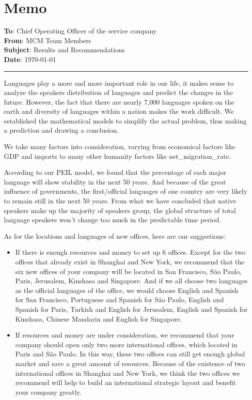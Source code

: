 \documentclass{mcmthesis}
\begin{document}
  
  \section{Memo}
  
  \textbf{To}: Chief Operating Officer of the service company\\
  \textbf{From}: MCM Team Members\\
  \textbf{Subject}: Results and Recommendations\\
  \textbf{Date}: {\today}\\
   \noindent\rule{\textwidth}{0.5pt}
   
      Languages play a more and more important role in our life, it makes sense to analyze the speakers distribution of languages and predict the changes in the future. However, the fact that there are nearly 7,000 languages spoken on the earth and diversity of languages within a nation makes the work difficult. We established the mathematical models to simplify the actual problem, thus making a prediction and drawing a conclusion.
      
     \indent We take many factors into consideration, varying from economical factors like GDP and imports to many other humanity factors like net\_migration\_rate.
      
      According to our PEIL model, we found that the percentage of each major language will show stability in the next 50 years. And because of the great influence of governments, the first/official languages of one country are very likely to remain still in the next 50 years. From what we have concluded that native speakers make up the majority of speakers group, the global structure of total language speakers won't change too much in the predictable time period. 
      
      As for the locations and languages of new offices, here are our suggestions:
   \begin{itemize}
      \item If there is enough resources and money to set up 6 offices. Except for the two offices that already exist in Shanghai and New York, we recommend that the six new offices of your company will be located in San Francisco, São Paulo, Paris, Jerusalem, Kinshasa and Singapore. And if we all choose two languages as the official languages of the office, we would choose English and Spanish for San Francisco,  Portuguese and Spanish for São Paulo,  English and Spanish for Paris, Turkish and English for Jerusalem,  English and Spanish for Kinshasa, Chinese Mandarin and English for Singapore.
      \item If resources and money are under consideration, we recommend that your company should open only two more international offices, which located in Paris and São Paulo. In this way,  these two offices can still get enough global market  and  save a great amount of resources. Because of the existence of two international offices in Shanghai and New York, we think the two offices we recommend will help to build an international strategic layout and benefit your company greatly.
    \end{itemize}
      
\end{document}
